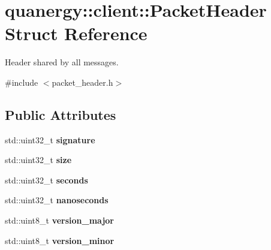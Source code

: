 \hypertarget{structquanergy_1_1client_1_1PacketHeader}{\section{quanergy\-:\-:client\-:\-:Packet\-Header Struct Reference}
\label{structquanergy_1_1client_1_1PacketHeader}
}


Header shared by all messages.  




{\ttfamily \#include $<$packet\-\_\-header.\-h$>$}

\subsection*{Public Attributes}
\begin{DoxyCompactItemize}
\item 
\hypertarget{structquanergy_1_1client_1_1PacketHeader_a0113ae6ee537998b0d5357f3768fa51d}{std\-::uint32\-\_\-t {\bfseries signature}}\label{structquanergy_1_1client_1_1PacketHeader_a0113ae6ee537998b0d5357f3768fa51d}

\item 
\hypertarget{structquanergy_1_1client_1_1PacketHeader_a6d20d42b68991dee912d107855eb9617}{std\-::uint32\-\_\-t {\bfseries size}}\label{structquanergy_1_1client_1_1PacketHeader_a6d20d42b68991dee912d107855eb9617}

\item 
\hypertarget{structquanergy_1_1client_1_1PacketHeader_aa6b56fb5edde8906b255a6bf087fc961}{std\-::uint32\-\_\-t {\bfseries seconds}}\label{structquanergy_1_1client_1_1PacketHeader_aa6b56fb5edde8906b255a6bf087fc961}

\item 
\hypertarget{structquanergy_1_1client_1_1PacketHeader_aec03a337cba2b481b082015fbc2f75f8}{std\-::uint32\-\_\-t {\bfseries nanoseconds}}\label{structquanergy_1_1client_1_1PacketHeader_aec03a337cba2b481b082015fbc2f75f8}

\item 
\hypertarget{structquanergy_1_1client_1_1PacketHeader_ac36cd21bcc2ccd8388e1db2b8585f7a9}{std\-::uint8\-\_\-t {\bfseries version\-\_\-major}}\label{structquanergy_1_1client_1_1PacketHeader_ac36cd21bcc2ccd8388e1db2b8585f7a9}

\item 
\hypertarget{structquanergy_1_1client_1_1PacketHeader_ac8bcd8965a90bbf5312f21c7d310ecad}{std\-::uint8\-\_\-t {\bfseries version\-\_\-minor}}\label{structquanergy_1_1client_1_1PacketHeader_ac8bcd8965a90bbf5312f21c7d310ecad}


\end{DoxyCompactItemize}
